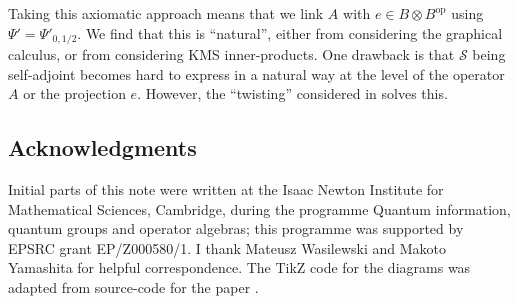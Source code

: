 \documentclass[a4paper,11pt]{article}
\theoremstyle{plain}
\theoremstyle{remark}
\newcommand{\mc}[1]{\mathcal{#1}}
\newcommand{\op}{{\operatorname{op}}}
\begin{document}
Taking this axiomatic approach means that we link $A$ with $e\in B\otimes B^\op$ using $\Psi' = \Psi'_{0,1/2}$.  We find that this is ``natural'', either from considering the graphical calculus, or from considering KMS inner-products.  One drawback is that $\mc S$ being self-adjoint becomes hard to express in a natural way at the level of the operator $A$ or the projection $e$.  However, the ``twisting'' considered in \cite{Wasilewski_Quantum_Cayley} solves this.

\subsection{Acknowledgments}

Initial parts of this note were written at the Isaac Newton Institute for Mathematical Sciences, Cambridge, during the programme Quantum information, quantum groups and operator algebras; this programme was supported by EPSRC grant EP/Z000580/1.  I thank Mateusz Wasilewski and Makoto Yamashita for helpful correspondence.  The TikZ code for the diagrams was adapted from source-code for the paper \cite{matsuda_class_m2}.




\end{document}
